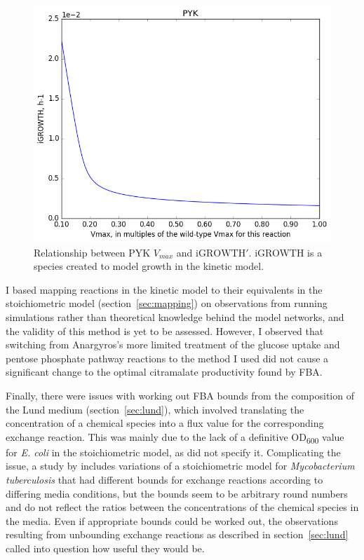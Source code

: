 \documentclass[parskip=full, numbers=noenddot]{scrreprt}
\begin{document}
\begin{figure}[htbp]
  \centering
  \includegraphics[scale=0.4]{issues_igrowth}
  \caption{Relationship between PYK $V_{max}$ and $\mathrm{iGROWTH}'$. iGROWTH is a species created to model growth in the kinetic model.}
  \label{fig:issues_igrowth}
\end{figure}

I based mapping reactions in the kinetic model to their equivalents in the stoichiometric model (section~\ref{sec:mapping}) on observations from running simulations rather than theoretical knowledge behind the model networks, and the validity of this method is yet to be assessed. However, I observed that switching from Anargyros's more limited treatment of the glucose uptake and pentose phosphate pathway reactions to the method I used did not cause a significant change to the optimal citramalate productivity found by FBA.

Finally, there were issues with working out FBA bounds from the composition of the Lund medium (section~\ref{sec:lund}), which involved translating the concentration of a chemical species into a flux value for the corresponding exchange reaction. This was mainly due to the lack of a definitive OD\textsubscript{600} value for \emph{E. coli} in the stoichiometric model, as \citet{orth_comprehensive_2011} did not specify it. Complicating the issue, a study by \citet{kavvas_updated_2018} includes variations of a stoichiometric model for \emph{Mycobacterium tuberculosis} that had different bounds for exchange reactions according to differing media conditions, but the bounds seem to be arbitrary round numbers and do not reflect the ratios between the concentrations of the chemical species in the media. Even if appropriate bounds could be worked out, the observations resulting from unbounding exchange reactions as described in section~\ref{sec:lund} called into question how useful they would be.
\end{document}

